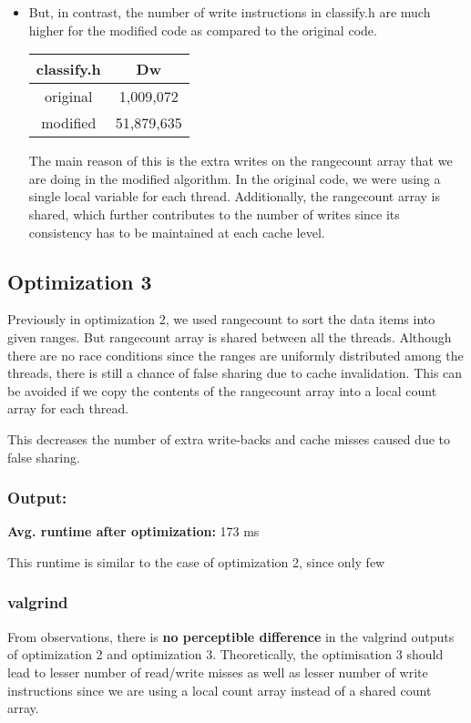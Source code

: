 \documentclass{article}
\begin{document}
\begin{itemize}
        \item But, in contrast, the number of write instructions in classify.h are much higher for the modified code as compared to the original code. 
        
        \begin{center}
            \begin{tabular}{|c|c|}
                \hline
                \textbf{classify.h} & \textbf{Dw} \\
                \hline
                original & 1,009,072 \\
                \hline
                modified & 51,879,635 \\
                \hline
            \end{tabular}
        \end{center}
        The main reason of this is the extra writes on the rangecount array that we are doing in the modified algorithm. In the original code, we were using a single local variable for each thread. Additionally, the rangecount array is shared, which further contributes to the number of writes since its consistency has to be maintained at each cache level.  
        
    \end{itemize}

    \subsection{Optimization 3}
    Previously in optimization 2, we used rangecount to sort the data items into given ranges. But rangecount array is shared between all the threads. Although there are no race conditions since the ranges are uniformly distributed among the threads, there is still a chance of false sharing due to cache invalidation. This can be avoided if we copy the contents of the rangecount array into a local count array for each thread.
    
    This decreases the number of extra write-backs and cache misses caused due to false sharing. 
    
    \subsubsection{Output:}
    \textbf{Avg. runtime after optimization:} 173 ms

    This runtime is similar to the case of optimization 2, since only few

    \subsubsection{valgrind}
    From observations, there is \textbf{no perceptible difference} in the valgrind outputs of optimization 2 and optimization 3. Theoretically, the optimisation 3 should lead to lesser number of read/write misses as well as lesser number of write instructions since we are using a local count array instead of a shared count array.
\end{document}
